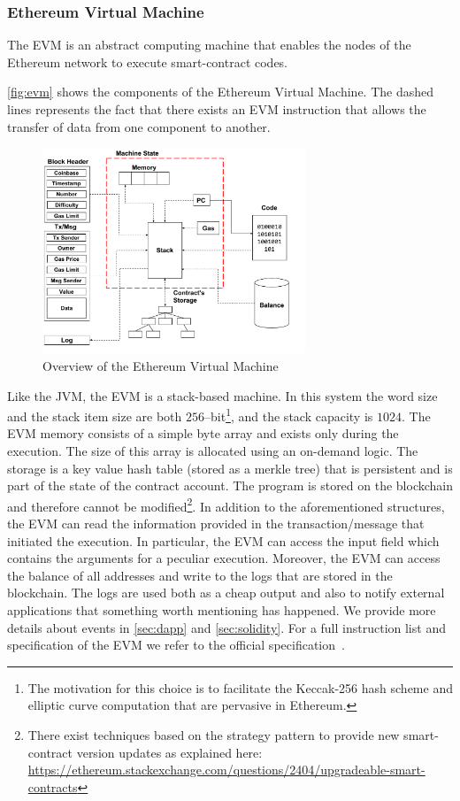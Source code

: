 \subsubsection{Ethereum Virtual Machine}
\label{sec:evm}
The EVM is an abstract computing machine that enables the nodes of the Ethereum
network to execute smart-contract codes.

\autoref{fig:evm} shows the components of the Ethereum Virtual Machine. The
dashed lines represents the fact that there exists an EVM instruction that
allows the transfer of data from one component to another.
\begin{figure}
	\begin{center}
		\includegraphics[width=0.7\textwidth]
        {./res/img/evm-overview.pdf}
	\end{center}
	\caption{Overview of the Ethereum Virtual Machine}
	\label{fig:evm}
\end{figure}
Like the JVM, the EVM is a stack-based machine. In this system the word size and
the stack item size are both $256$--bit\footnote{The motivation for this choice
is to facilitate the Keccak-256 hash scheme and elliptic curve computation that
are pervasive in Ethereum.}, and the stack capacity is $1024$. The EVM memory
consists of a simple byte array and exists only during the execution. The size
of this array is allocated using an on-demand logic. The storage is a key value
hash table (stored as a merkle tree) that is persistent and is part of the state
of the contract account. The program is stored on the blockchain and therefore
cannot be modified\footnote{There exist techniques based on the strategy pattern
to provide new smart-contract version updates as explained here:
\url{https://ethereum.stackexchange.com/questions/2404/upgradeable-smart-contracts}}.
In addition to the aforementioned structures, the EVM can read the information
provided in the transaction/message that initiated the execution. In particular,
the EVM can access the input field which contains the arguments for a peculiar
execution. Moreover, the EVM can access the balance of all addresses and write
to the logs that are stored in the blockchain. The logs are used both as a cheap
output and also to notify external applications that something worth mentioning
has happened. We provide more details about events in \autoref{sec:dapp} and
\autoref{sec:solidity}. For a full instruction list and specification of the EVM
we refer to the official specification~\cite[Appendix H]{wood2018ethereum}.

